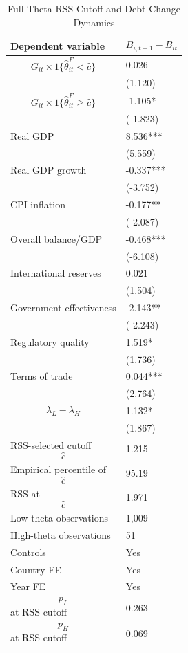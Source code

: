 \begin{table}[H]\centering
\begin{threeparttable}
\caption{Full-Theta RSS Cutoff and Debt-Change Dynamics}
\label{tab:deltaB_rss_cutoff_fulltheta}
\scriptsize
\begin{tabularx}{\textwidth}{lY}
\toprule
Dependent variable & $$B_{i,t+1}-B_{it}$$ \\
\midrule
$$G_{it}\times 1\{\widehat{\theta}^{F}_{it}<\widehat{c}\}$$ & 0.026 \\
 & (1.120) \\
$$G_{it}\times 1\{\widehat{\theta}^{F}_{it}\geq\widehat{c}\}$$ & -1.105* \\
 & (-1.823) \\
Real GDP & 8.536*** \\
 & (5.559) \\
Real GDP growth & -0.337*** \\
 & (-3.752) \\
CPI inflation & -0.177** \\
 & (-2.087) \\
Overall balance/GDP & -0.468*** \\
 & (-6.108) \\
International reserves & 0.021 \\
 & (1.504) \\
Government effectiveness & -2.143** \\
 & (-2.243) \\
Regulatory quality & 1.519* \\
 & (1.736) \\
Terms of trade & 0.044*** \\
 & (2.764) \\
$$\lambda_L-\lambda_H$$ & 1.132* \\
 & (1.867) \\
\midrule
RSS-selected cutoff $$\widehat{c}$$ & 1.215 \\
Empirical percentile of $$\widehat{c}$$ & 95.19 \\
RSS at $$\widehat{c}$$ & 1.971 \\
Low-theta observations & 1,009 \\
High-theta observations & 51 \\
Controls & Yes \\
Country FE & Yes \\
Year FE & Yes \\
$$p_L$$ at RSS cutoff & 0.263 \\
$$p_H$$ at RSS cutoff & 0.069 \\

\end{tabularx}
\end{threeparttable}
\end{table}
